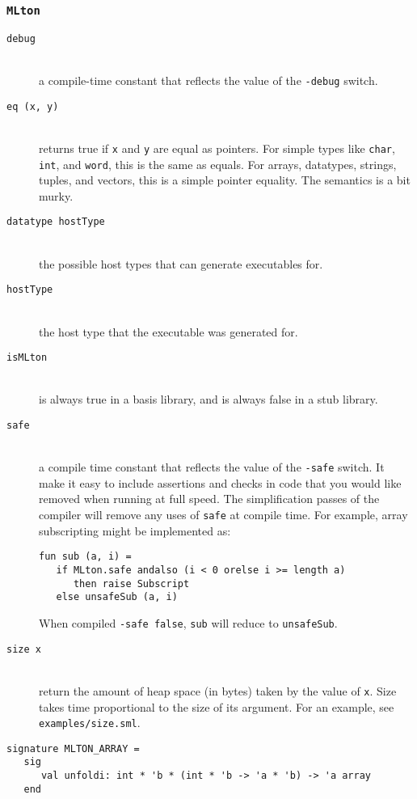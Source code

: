 \subsubsection{{\tt MLton}}

\newcommand{\entry}[1]{\item[\tt #1]\hspace{1in}\\}
\begin{description}

\entry{debug}
a compile-time constant that reflects the value of the {\tt -debug} switch.

\entry{eq (x, y)}
returns true if {\tt x} and {\tt y} are equal as pointers.  For simple types
like {\tt char}, {\tt int}, and {\tt word}, this is the same as equals.  For
arrays, datatypes, strings, tuples, and vectors, this is a simple pointer
equality.  The semantics is a bit murky.

\entry{datatype hostType}
the possible host types that {\mlton} can generate executables for.

\entry{hostType}
the host type that the executable was generated for.

\entry{isMLton}
is always true in a {\mlton} basis library, and is always false in a stub
library.

\entry{safe}
a compile time constant that reflects the value of the {\tt -safe} switch.  It
make it easy to include assertions and checks in code that you would like
removed when running at full speed. The simplification passes of the compiler
will remove any uses of {\tt safe} at compile time.  For example, array
subscripting might be implemented as:
\begin{verbatim}
fun sub (a, i) =
   if MLton.safe andalso (i < 0 orelse i >= length a)
      then raise Subscript
   else unsafeSub (a, i)
\end{verbatim}
When compiled {\tt -safe false}, {\tt sub} will reduce to
{\tt unsafeSub}.

\entry{size x}
return the amount of heap space (in bytes) taken by the value of {\tt x}.  Size
takes time proportional to the size of its argument.  For an example, see {\tt
examples/size.sml}.

\end{description}

\begin{verbatim}
signature MLTON_ARRAY =
   sig
      val unfoldi: int * 'b * (int * 'b -> 'a * 'b) -> 'a array
   end
\end{verbatim}

